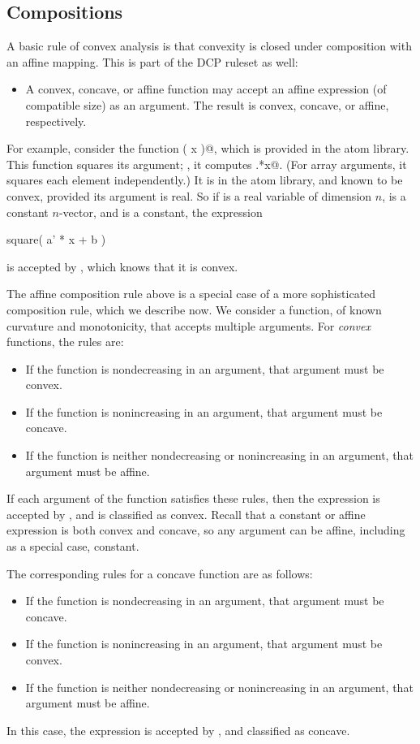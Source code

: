 \documentclass[12pt]{article}
\begin{document}
\subsection{Compositions}
\label{sec:compositions}

A basic rule of convex analysis is that convexity is closed under 
composition with an affine mapping. 
This is part of the DCP ruleset as well:
\begin{itemize}
\item A convex, concave, or affine function may accept an affine expression
(of compatible size) as an argument.
The result is convex, concave, or affine, respectively.
\end{itemize}
For example, consider the function \verb@square( x )@, which is provided
in the \cvx atom library. 
This function squares its argument; \ie, it computes
\verb@x.*x@. 
(For array arguments, it squares each element independently.)
It is in the \cvx atom library, and known to be convex, provided its
argument is real.  So if \verb@x@ is a real variable of dimension $n$,
\verb@a@ is a constant $n$-vector, and \verb@b@ is a constant,
the expression
\begin{code}
	square( a' * x + b )
\end{code}
is accepted by \cvx, which knows that it is convex.

The affine composition rule above is a special case of a more
sophisticated composition rule, which we describe now. 
We consider a function, of known curvature and monotonicity, that accepts
multiple arguments.  For \emph{convex} functions, the rules are:
\begin{itemize}
\item If the function is nondecreasing in an argument,
that argument must be convex.
\item If the function is nonincreasing in an argument,
that argument must be concave.
\item If the function is neither nondecreasing or nonincreasing
in an argument, that argument must be affine.
\end{itemize}
If each argument of the function satisfies these rules, then the expression
is accepted by \cvx, and is classified as convex.
Recall that a constant or affine expression is both convex and concave,
so any argument can be affine, including as a special case, constant. 

The corresponding rules for a concave function are as follows:
\begin{itemize}
\item If the function is nondecreasing in an argument,
that argument must be concave.
\item If the function is nonincreasing in an argument,
that argument must be convex.
\item If the function is neither nondecreasing or nonincreasing
in an argument, that argument must be affine.
\end{itemize}
In this case, the expression is accepted by \cvx, and classified
as concave.
\end{document}
